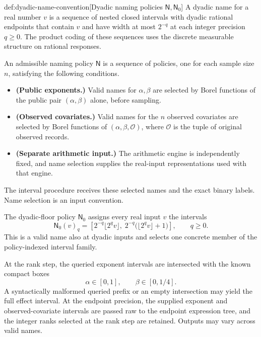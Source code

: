 \documentclass[11pt]{article}
\begin{document}
\begin{definitionv}{def:dyadic-name-convention}[Dyadic naming policies \(\mathsf N,\mathsf N_0\)]
A dyadic name for a real number \(v\) is a sequence of nested closed intervals with dyadic rational endpoints that contain \(v\) and have width at most \(2^{-q}\) at each integer precision \(q\ge0\). The product coding of these sequences uses the discrete measurable structure on rational responses.

An admissible naming policy \(\mathsf N\) is a sequence of policies, one for each sample size \(n\), satisfying the following conditions.
\begin{itemize}
\item \textbf{(Public exponents.)} Valid names for \(\alpha,\beta\) are selected by Borel functions of the public pair \((\alpha,\beta)\) alone, before sampling.
\item \textbf{(Observed covariates.)} Valid names for the \(n\) observed covariates are selected by Borel functions of \((\alpha,\beta,\mathcal O)\), where \(\mathcal O\) is the tuple of original observed records.
\item \textbf{(Separate arithmetic input.)} The arithmetic engine is independently fixed, and name selection supplies the real-input representations used with that engine.
\end{itemize}
The interval procedure receives these selected names and the exact binary labels. Name selection is an input convention.

The dyadic-floor policy \(\mathsf N_0\) assigns every real input \(v\) the intervals
\[
\mathsf N_0(v)_q
=
\left[
2^{-q}\lfloor2^qv\rfloor,\;
2^{-q}\bigl(\lfloor2^qv\rfloor+1\bigr)
\right],
\qquad q\ge0.
\]
This is a valid name also at dyadic inputs and selects one concrete member of the policy-indexed interval family.

At the rank step, the queried exponent intervals are intersected with the known compact boxes
\[
\alpha\in[0,1],\qquad \beta\in[0,1/4].
\]
A syntactically malformed queried prefix or an empty intersection may yield the full effect interval. At the endpoint precision, the supplied exponent and observed-covariate intervals are passed raw to the endpoint expression tree, and the integer ranks selected at the rank step are retained. Outputs may vary across valid names.
\end{definitionv}
\end{document}
